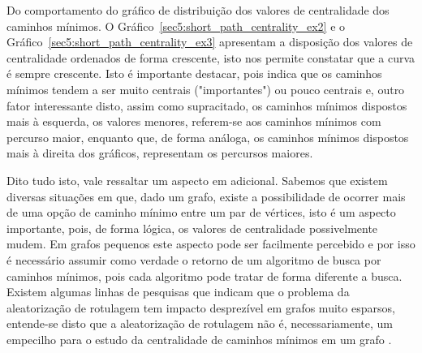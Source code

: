 Do comportamento do gráfico de distribuição dos valores de centralidade dos caminhos mínimos. O Gráfico~\ref{sec5:short_path_centrality_ex2} e o Gráfico~\ref{sec5:short_path_centrality_ex3} apresentam a disposição dos valores de centralidade ordenados de forma crescente, isto nos permite constatar que a curva é sempre crescente. Isto é importante destacar, pois indica que os caminhos mínimos tendem a ser muito centrais ("importantes") ou pouco centrais e, outro fator interessante disto, assim como supracitado, os caminhos mínimos dispostos mais à esquerda, os valores menores, referem-se aos caminhos mínimos com percurso maior, enquanto que, de forma análoga, os caminhos mínimos dispostos mais à direita dos gráficos, representam os percursos maiores.

Dito tudo isto, vale ressaltar um aspecto em adicional. Sabemos que existem diversas situações em que, dado um grafo, existe a possibilidade de ocorrer mais de uma opção de caminho mínimo entre um par de vértices, isto é um aspecto importante, pois, de forma lógica, os valores de centralidade possivelmente mudem. Em grafos pequenos este aspecto pode ser facilmente percebido e por isso é necessário assumir como verdade o retorno de um algoritmo de busca por caminhos mínimos, pois cada algoritmo pode tratar de forma diferente a busca. Existem algumas linhas de pesquisas que indicam que o problema da aleatorização de rotulagem tem impacto desprezível em grafos muito esparsos, entende-se disto que a aleatorização de rotulagem não é, necessariamente, um empecilho para o estudo da centralidade de caminhos mínimos em um grafo \cite{alane2021}.